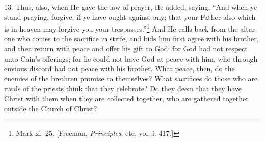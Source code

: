 13. Thus, also, when He gave the law of prayer, He added, saying, “And when ye stand praying, forgive, if ye have ought against any; that your Father also which is in heaven may forgive you your trespasses.”\footnote{Mark xi. 25. [Freeman, \emph{Principles}, etc. vol. i. 417.]} And He calls back from the altar one who comes to the sacrifice in strife, and bids him first agree with his brother, and then return with peace and offer his gift to God: for God had not respect unto Cain’s offerings; for he could not have God at peace with him, who through envious discord had not peace with his brother. What peace, then, do the enemies of the brethren promise to themselves? What sacrifices do those who are rivals of the priests think that they celebrate? Do they deem that they have Christ with them when they are collected together, who are gathered together outside the Church of Christ?

